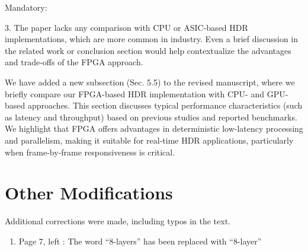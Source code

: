 \documentclass[a4j]{jsarticle}
\begin{document}
\vspace{0.3cm}
\begin{screen}
Mandatory:

3. The paper lacks any comparison with CPU or ASIC-based HDR implementations, which are more common in industry. Even a brief discussion in the related work or conclusion section would help contextualize the advantages and trade-offs of the FPGA approach.
\end{screen}
We have added a new subsection (Sec. 5.5) to the revised manuscript, 
where we briefly compare our FPGA-based HDR implementation 
with CPU- and GPU-based approaches.
This section discusses typical performance characteristics (such as latency and 
throughput) based on previous studies and reported benchmarks. 
We highlight that FPGA offers advantages in deterministic low-latency processing 
and parallelism, making it suitable for real-time HDR applications, 
particularly when frame-by-frame responsiveness is critical.


\section*{Other Modifications}
Additional corrections were made, including typos in the text.

\begin{enumerate}
  \item Page 7, left : The word ``8-layers'' has been replaced with ``8-layer''
\end{enumerate}
\end{document}
